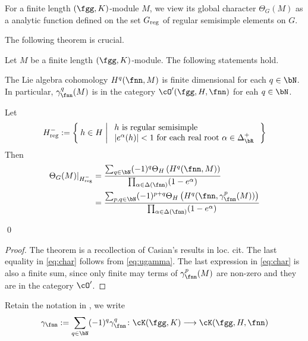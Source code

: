 \documentclass[counting_main.tex]{subfiles}
\begin{document}
For a finite length $(\fgg,K)$-module $M$, we view its global character
$\Theta_{G}(M)$ as a analytic function defined on the set $G_{\text{reg}}$ of regular
semisimple elements on $G$.


The following theorem is crucial.
\begin{thm}\label{thm:gamma.HC}
  Let $M$ be a finite length $(\fgg,K)$-module. The following statements hold.
  \begin{enumT}
    \item The Lie algebra cohomology $H^{q}(\fnn,M)$ is finite dimensional for
    each $q\in \bN$. In particular, $\gamma_{\fnn}^{q}(M)$ is in the category
    $\cO'(\fgg,H,\fnn)$ for eah $q\in \bN$.
    \item
    Let
    \[
      \Hnreg:= \Set{h\in H|
        \begin{array}{l}
          \text{$h$ is regular semisimple}\\
          \abs{e^{\alpha}(h)}<1 \text{ for each real root }
          \alpha\in \Delta^{+}_{\bR}
        \end{array}
      }
    \]
    Then
    \begin{equation}\label{eq:char}
      \begin{split}
        \Theta_{G}(M)|_{\Hnreg} &= \frac{\sum_{q\in \bN} (-1)^{q}\Theta_{H} \left(H^{q}(\fnn,M)\right)}
        {\prod_{\alpha\in \WT{\fnn}}(1- e^{\alpha})}\\
        &= \frac{\sum_{p,q\in \bN} (-1)^{p+q}\Theta_{H} \left(H^{q}(\fnn,\gamma_{\fnn}^{p}(M))\right)}
        {\prod_{\alpha\in \WT{\fnn}}(1- e^{\alpha})}\\
      \end{split}
    \end{equation}
  \end{enumT}
  \qed
\end{thm}
\begin{proof}
  The theorem is a recollection of Casian's results in loc. cit. The last
  equality in \eqref{eq:char} follows from \eqref{eq:ugamma}. The last
  expression in \eqref{eq:char} is also a finite sum, since only finite may
  terms of $\gamma_{\fnn}^{p}(M)$ are non-zero and they are in the category
  $\cO'$.
\end{proof}


Retain the notation in , we write
\[
  \gamma_{\fnn}:= \sum_{q\in \bN} (-1)^{q} \gamma^{q}_{\fnn}\colon \Grt(\fgg,K) \longrightarrow \Grt(\fgg,H,\fnn)
\]
\end{document}
